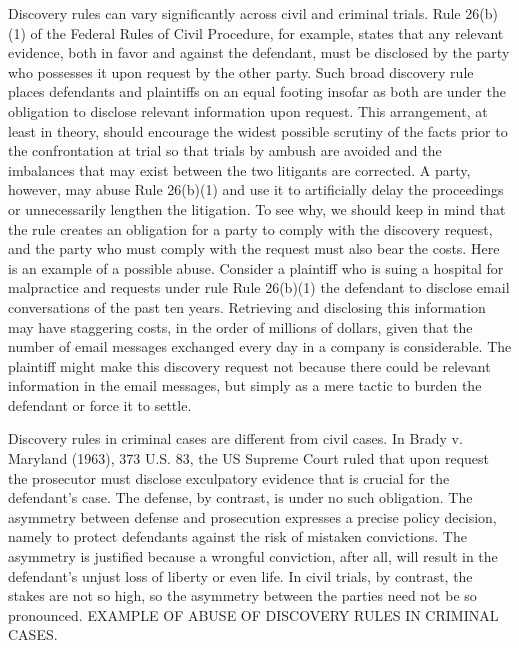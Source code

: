 \documentclass[10pt]{article}
\begin{document}
 Discovery rules can vary significantly across civil and criminal trials. Rule 26(b)(1) of the Federal Rules of Civil Procedure, for example, states that any relevant evidence, both in favor and against the defendant, must be disclosed by the party who possesses it upon request by the other party. Such broad discovery rule places defendants and plaintiffs on an equal footing insofar as both are under the obligation to disclose relevant information upon request.
This arrangement, 
at least in theory, should encourage the widest possible scrutiny of the facts prior to the confrontation at 
trial so that trials by ambush are avoided and the imbalances that may exist between the two litigants are corrected. 
A party, however, may abuse Rule 26(b)(1) and use it to artificially delay the proceedings or unnecessarily lengthen the litigation. 
To see why, we should keep in mind that the rule creates an obligation for a party to comply with the discovery request, and the party who must comply with the request must also bear the costs. Here is an example of a possible abuse. 
Consider a plaintiff who is suing a hospital for malpractice and requests under rule Rule 26(b)(1) the defendant 
to disclose email conversations of the past ten years. Retrieving and disclosing this information may have staggering costs, in the order of millions of dollars, given that the number of email messages exchanged every day in a company is considerable. 
The plaintiff might make this discovery request not because there could be relevant information in the email messages, but simply as a mere tactic to burden the defendant or force it to settle.

 
Discovery rules in criminal cases are different from civil cases. 
In Brady v. Maryland (1963), 373 U.S. 83, the US Supreme Court ruled that upon request the prosecutor must 
disclose exculpatory evidence that is crucial for the defendant's case. The defense, by contrast, is under no such obligation.
The asymmetry between defense and prosecution expresses a precise policy decision, namely to protect defendants against 
the risk of mistaken convictions. The asymmetry is justified  because a wrongful conviction, after all, will result  
in the defendant's unjust loss of liberty or even life. In civil trials, by contrast, the stakes are not so high, 
so the asymmetry between the parties need not be so pronounced.
EXAMPLE OF ABUSE OF DISCOVERY RULES IN CRIMINAL CASES.
\end{document}
